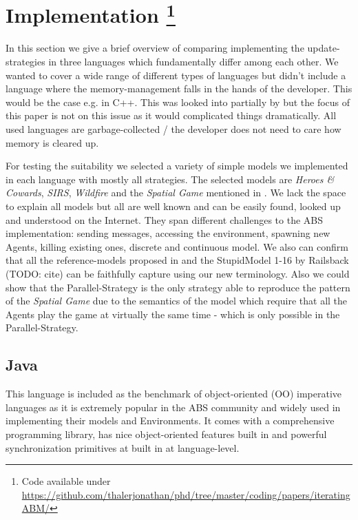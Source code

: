 \section[Implementation]{Implementation \footnote{Code available under\\ \url{https://github.com/thalerjonathan/phd/tree/master/coding/papers/iteratingABM/}}}
In this section we give a brief overview of comparing implementing the update-strategies in three languages which fundamentally differ among each other. We wanted to cover a wide range of different types of languages but didn't include a language where the memory-management falls in the hands of the developer. This would be the case e.g. in C++. This was looked into partially by \cite{dawson_opening_2014} but the focus of this paper is not on this issue as it would complicated things dramatically. All used languages are garbage-collected / the developer does not need to care how memory is cleared up.

For testing the suitability we selected a variety of simple models we implemented in each language with mostly all strategies. The selected models are \textit{Heroes \& Cowards}, \textit{SIRS}, \textit{Wildfire} and the \textit{Spatial Game} mentioned in \cite{huberman_evolutionary_1993}. We lack the space to explain all models but all are well known and can be easily found, looked up and understood on the Internet. They span different challenges to the ABS implementation: sending messages, accessing the environment, spawning new Agents, killing existing ones, discrete and continuous model. We also can confirm that all the reference-models proposed in \cite{isaac_abm_2011} and the StupidModel 1-16 by Railsback (TODO: cite) can be faithfully capture using our new terminology. Also we could show that the  Parallel-Strategy is the only strategy able to reproduce the pattern of the \textit{Spatial Game} due to the semantics of the model which require that all the Agents play the game at virtually the same time - which is only possible in the Parallel-Strategy.



\subsection{Java}
This language is included as the benchmark of object-oriented (OO) imperative languages as it is extremely popular in the ABS community and widely used in implementing their models and Environments. It comes with a comprehensive programming library, has nice object-oriented features built in and powerful synchronization primitives at built in at language-level. \\

